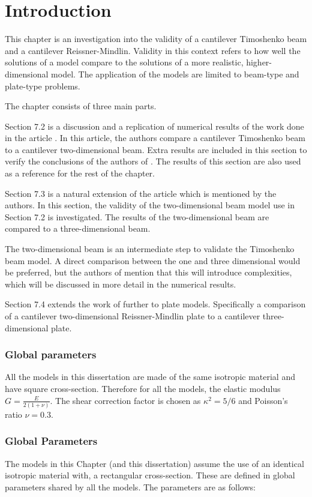 \documentclass[../../main.tex]{subfiles}
\begin{document}
\section{Introduction}
This chapter is an investigation into the validity of a cantilever Timoshenko beam and a cantilever Reissner-Mindlin. Validity in this context refers to how well the solutions of a model compare to the solutions of a more realistic, higher-dimensional model. The application of the models are limited to beam-type and plate-type problems.

The chapter consists of three main parts.

Section 7.2 is a discussion and a replication of numerical results of the work done in the article \cite{LVV09}. In this article, the authors compare a cantilever Timoshenko beam to a cantilever two-dimensional beam. Extra results are included in this section to verify the conclusions of the authors of \cite{LVV09}. The results of this section are also used as a reference for the rest of the chapter.

Section 7.3 is a natural extension of the article \cite{LVV09} which is mentioned by the authors. In this section, the validity of the two-dimensional beam model use in Section 7.2 is investigated. The results of the two-dimensional beam are compared to a three-dimensional beam. 

The two-dimensional beam is an intermediate step to validate the Timoshenko beam model. A direct comparison between the one and three dimensional would be preferred, but the authors of \cite{LVV09} mention that this will introduce complexities, which will be discussed in more detail in the numerical results.

Section 7.4 extends the work of \cite{LVV09} further to plate models. Specifically a comparison of a cantilever two-dimensional Reissner-Mindlin plate to a cantilever three-dimensional plate. 

\subsubsection{Global parameters}
All the models in this dissertation are made of the same isotropic material and have square cross-section. Therefore for all the models, the elastic modulus $\displaystyle G = \frac{E}{2(1+\nu)}$. The shear correction factor is chosen as $\kappa^2 = 5/6$ and Poisson's ratio $\nu = 0.3$.\\


\subsubsection{Global Parameters}
The models in this Chapter (and this dissertation) assume the use of an identical isotropic material with, a rectangular cross-section. These are defined in global parameters shared by all the models. The parameters are as follows:
\end{document}
